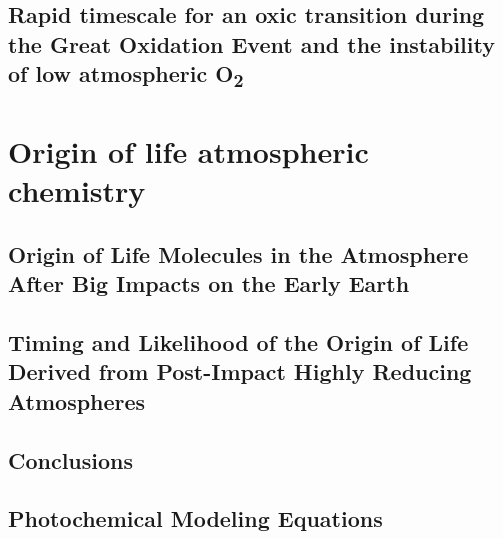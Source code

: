 \documentclass[11pt, proquest]{uwthesis}[2016/11/22]
\begin{document}
\chapter{Rapid timescale for an oxic transition during the Great Oxidation Event and the instability of low atmospheric O\textsubscript{2}} \label{ch:4}
\newpage


\part{Origin of life atmospheric chemistry} \label{pt:2}

\chapter{Origin of Life Molecules in the Atmosphere After Big Impacts on the Early Earth} \label{ch:5}
\newpage


\chapter{Timing and Likelihood of the Origin of Life Derived from Post-Impact Highly Reducing Atmospheres} \label{ch:6}
\newpage


\chapter{Conclusions}
\newpage


\printendnotes

%
%


%
%
\appendix
\raggedbottom\sloppy
 
 
\chapter{Photochemical Modeling Equations}
\newpage

 
\end{document}
